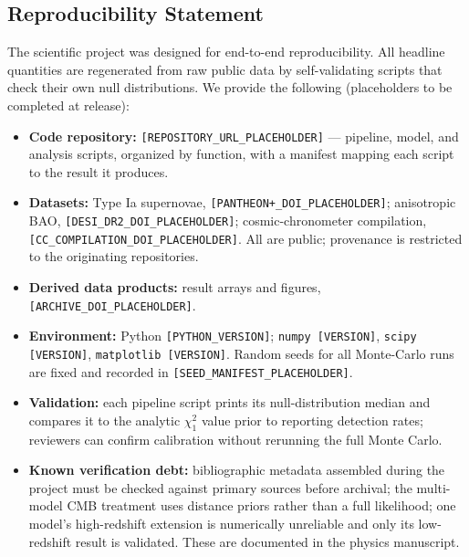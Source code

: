 \documentclass[11pt]{article}
\begin{document}
\subsection{Reproducibility Statement}
\label{sec:repro}

The scientific project was designed for end-to-end reproducibility. All headline
quantities are regenerated from raw public data by self-validating scripts that
check their own null distributions. We provide the following (placeholders to be
completed at release):

\begin{itemize}[leftmargin=1.5em]
  \item \textbf{Code repository:} \texttt{[REPOSITORY\_URL\_PLACEHOLDER]}
        --- pipeline, model, and analysis scripts, organized by function, with a
        manifest mapping each script to the result it produces.
  \item \textbf{Datasets:} Type Ia supernovae, \texttt{[PANTHEON+\_DOI\_PLACEHOLDER]};
        anisotropic BAO, \texttt{[DESI\_DR2\_DOI\_PLACEHOLDER]}; cosmic-chronometer
        compilation, \texttt{[CC\_COMPILATION\_DOI\_PLACEHOLDER]}. All are public;
        provenance is restricted to the originating repositories.
  \item \textbf{Derived data products:} result arrays and figures,
        \texttt{[ARCHIVE\_DOI\_PLACEHOLDER]}.
  \item \textbf{Environment:} Python
        \texttt{[PYTHON\_VERSION]}; \texttt{numpy [VERSION]},
        \texttt{scipy [VERSION]}, \texttt{matplotlib [VERSION]}. Random seeds for
        all Monte-Carlo runs are fixed and recorded in
        \texttt{[SEED\_MANIFEST\_PLACEHOLDER]}.
  \item \textbf{Validation:} each pipeline script prints its null-distribution
        median and compares it to the analytic $\chi^2_1$ value prior to reporting
        detection rates; reviewers can confirm calibration without rerunning the
        full Monte Carlo.
  \item \textbf{Known verification debt:} bibliographic metadata assembled during
        the project must be checked against primary sources before archival; the
        multi-model CMB treatment uses distance priors rather than a full
        likelihood; one model's high-redshift extension is numerically unreliable
        and only its low-redshift result is validated. These are documented in the
        physics manuscript.
\end{itemize}
\end{document}
